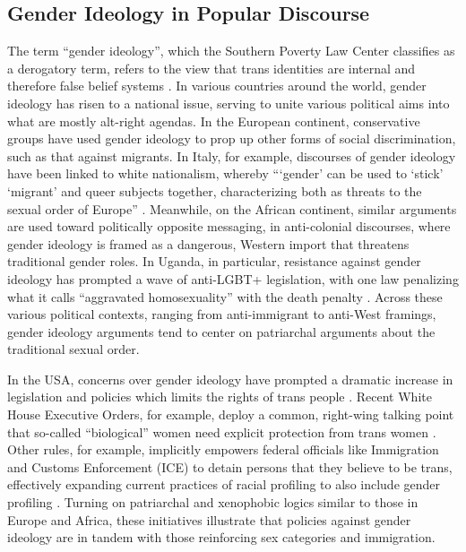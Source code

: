 \documentclass[11pt]{article}
\begin{document}
\subsection{Gender Ideology in Popular Discourse}
The term “gender ideology”, which the Southern Poverty Law Center classifies as a derogatory term, refers to the view that trans identities are internal and therefore false belief systems \citep{splc:2023}. In various countries around the world, gender ideology has risen to a national issue, serving to unite various political aims into what are mostly alt-right agendas. In the European continent, conservative groups have used gender ideology to prop up other forms of social discrimination, such as that against migrants. In Italy, for example, discourses of gender ideology have been linked to white nationalism, whereby “‘gender’ can be used to ‘stick’ ‘migrant’ and queer subjects together, characterizing both as threats to the sexual order of Europe” \citep{indelicato:2024}. Meanwhile, on the African continent, similar arguments are used toward politically opposite messaging, in anti-colonial discourses, where gender ideology is framed as a dangerous, Western import that threatens traditional gender roles. In Uganda, in particular, resistance against gender ideology has prompted a wave of anti-LGBT+ legislation, with one law penalizing what it calls “aggravated homosexuality” with the death penalty \citep{bbc:2023}. Across these various political contexts, ranging from anti-immigrant to anti-West framings, gender ideology arguments tend to center on patriarchal arguments about the traditional sexual order.

In the USA, concerns over gender ideology have prompted a dramatic increase in legislation and policies which limits the rights of trans people \citep{ussd:2025,whitehousea:2025,whitehouseb:2025,translegislation:2025}. Recent White House Executive Orders, for example, deploy a common, right-wing talking point that so-called “biological” women need explicit protection from trans women \citep{whitehousea:2025,whitehouseb:2025}. Other rules, for example, implicitly empowers federal officials like Immigration and Customs Enforcement (ICE) to detain persons that they believe to be trans, effectively expanding current practices of racial profiling to also include gender profiling \citep{vaca:206}. Turning on patriarchal and xenophobic logics similar to those in Europe and Africa, these initiatives illustrate that policies against gender ideology are in tandem with those reinforcing sex categories and immigration. 
\end{document}
